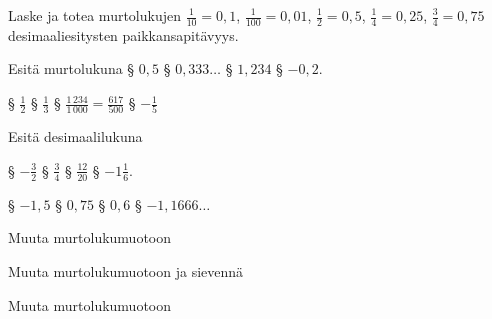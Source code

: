 \begin{tehtavasivu}

\begin{tehtava}
Laske ja totea murtolukujen 
 $ \frac{1}{10} = 0,1$, 
$ \frac{1}{100} = 0,01$, 
 $ \frac{1}{2} = 0,5$, 
$ \frac{1}{4} = 0,25$, 
$ \frac{3}{4} = 0,75$
desimaaliesitysten paikkansapitävyys.
\end{tehtava}

\begin{tehtava}
Esitä murtolukuna
§ $0,5$ 
§ $0,333\ldots$ 
§ $1,234$ 
§ $-0,2$.
\begin{vastaus}
§ $\frac{1}{2}$ 
§ $\frac{1}{3}$
§ $\frac{1\,234}{1\,000}=\frac{617}{500}$
§ $-\frac{1}{5}$
\end{vastaus}
\end{tehtava}

\begin{tehtava}
Esitä desimaalilukuna

§ $-\frac{3}{2}$ 
§ $\frac{3}{4}$
§ $\frac{12}{20}$
§ $-1\frac{1}{6}$.
\begin{vastaus}
§ $-1,5$ 
§ $0,75$ 
§ $0,6$ 
§ $-1,1666\ldots$
\end{vastaus}
\end{tehtava}

\begin{tehtava}
Muuta murtolukumuotoon
\begin{vastaus}
\end{vastaus}
\end{tehtava}

\begin{tehtava}
Muuta murtolukumuotoon ja sievennä
\begin{vastaus}
\end{vastaus}
\end{tehtava}

\begin{tehtava}
Muuta murtolukumuotoon
\begin{vastaus}
\end{vastaus}
\end{tehtava}


\end{tehtavasivu}
